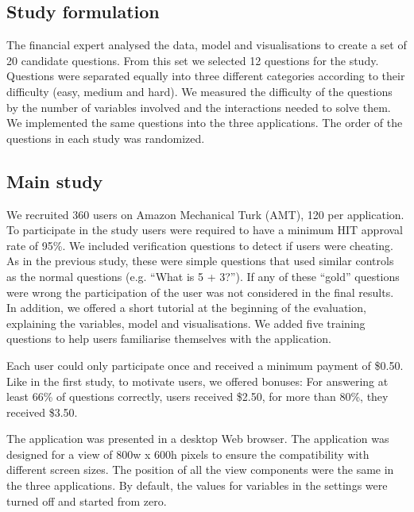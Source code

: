 \documentclass[final,5p,times,twocolumn,authoryear]{elsarticle}
\newcommand{\q}[1]{``#1''}
\begin{document}
\subsection{Study formulation}
The financial expert analysed the data, model and visualisations to create a set of 20 candidate questions. From this set we selected 12 questions for the study. Questions were separated equally into three different categories according to their difficulty (easy, medium and hard). We measured the difficulty of the questions by the number of variables involved and the interactions needed to solve them. We implemented the same questions into the three applications. The order of the questions in each study was randomized.
			
\subsection{Main study}

We recruited 360 users on Amazon Mechanical Turk (AMT), 120 per application. To  participate in the study users were required to have a minimum HIT approval rate of 95\%. We included verification questions to detect if users were cheating. As in the previous study, these were simple questions that used similar controls as the normal questions (e.g. \q{What is 5 + 3?}). If any of these \q{gold} questions were wrong the participation of the user was not considered in the final results. In addition, we offered a short tutorial at the beginning of the evaluation, explaining the variables, model and visualisations. We added five training questions to help users familiarise themselves with the application. 

Each user could only participate once and received a minimum payment of \$0.50. Like in the first study, to motivate users, we offered bonuses: For answering at least 66\% of questions correctly, users received \$2.50, for more than 80\%, they received \$3.50.

The application was presented in a desktop Web browser. The application was designed for a view of 800w x 600h pixels to ensure the compatibility with different screen sizes. The position of all the view components were the same in the three applications.  By default, the values for variables in the settings were turned off and started from zero. 

\end{document}
